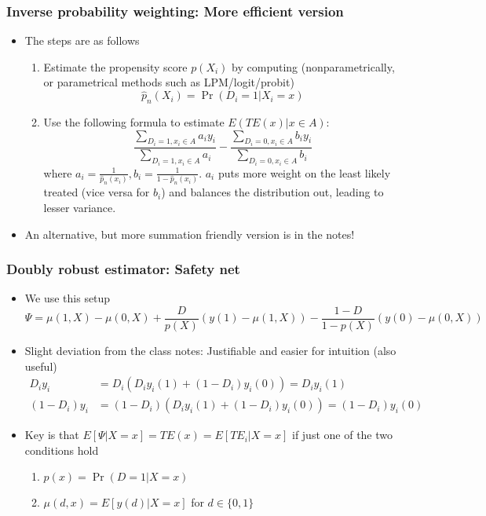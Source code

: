 \documentclass[aspectratio=169]{beamer}
\begin{document}
\begin{frame}
\frametitle{Inverse probability weighting: More efficient version}
\begin{itemize}
\item The steps are as follows
\begin{enumerate}
\item Estimate the propensity score $p(X_i)$ by computing (nonparametrically, or parametrical methods such as LPM/logit/probit)
\[
\hat{p}_n(X_i)=\Pr(D_i=1|X_i=x)
\]
\item Use the following formula to estimate $E(TE(x)|x\in A)$: 
\[
\frac{\sum_{D_i=1,x_i\in A}a_iy_i}{\sum_{D_i=1,x_i\in A}a_i}- \frac{\sum_{D_i=0,x_i\in A}b_iy_i}{\sum_{D_i=0,x_i\in A}b_i}
\]
where $a_i=\frac{1}{\hat{p}_n(x_i)}, b_i=\frac{1}{1-\hat{p}_n(x_i)}$. $a_i$  puts more weight on the least likely treated (vice versa for $b_i$) and balances the distribution out, leading to lesser variance. 
\end{enumerate}
\item An alternative, but more summation friendly version is in the notes!
\end{itemize}
\end{frame}

\begin{frame}
\frametitle{Doubly robust estimator: Safety net}
\begin{itemize}
\item We use this setup
\[
\Psi=\mu(1,X)-\mu(0,X)+\frac{D}{p(X)}(y(1)-\mu(1,X))-\frac{1-D}{1-p(X)}(y(0)-\mu(0,X))
\]
\item Slight deviation from the class notes: Justifiable and easier for intuition (also useful)
\begin{align*}
D_iy_i& = D_i(D_iy_i(1)+(1-D_i)y_i(0))=D_iy_i(1)\\
(1-D_i)y_i&=(1-D_i)(D_iy_i(1)+(1-D_i)y_i(0))=(1-D_i)y_i(0)
\end{align*}
\item Key is that $E[\Psi|X=x]=TE(x)=E[TE_i|X=x]$ if just one of the two conditions hold
\begin{enumerate}
\item $p(x)=\Pr(D=1|X=x)$
\item $\mu(d,x)=E[y(d)|X=x]$ for $d\in\{0,1\}$
\end{enumerate}
\end{itemize}
\end{frame}
\end{document}
